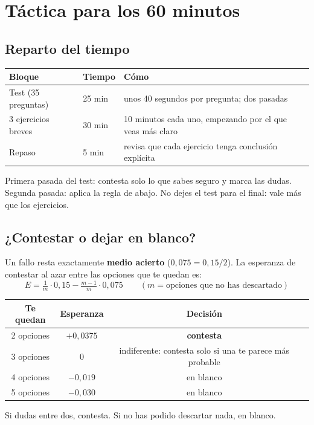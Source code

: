 \documentclass[11pt,a4paper,oneside]{report}
\begin{document}
\tableofcontents
\clearpage

\section{Táctica para los 60 minutos}

\subsection{Reparto del tiempo}
\begin{center}
\begin{tabular}{lll}
\toprule
\textbf{Bloque} & \textbf{Tiempo} & \textbf{Cómo} \\ \midrule
Test (35 preguntas) & 25 min & unos 40 segundos por pregunta; dos pasadas \\
3 ejercicios breves & 30 min & 10 minutos cada uno, empezando por el que veas más claro \\
Repaso & 5 min & revisa que cada ejercicio tenga conclusión explícita \\
\bottomrule
\end{tabular}
\end{center}
Primera pasada del test: contesta solo lo que sabes seguro y marca las dudas. Segunda pasada: aplica la regla
de abajo. No dejes el test para el final: vale más que los ejercicios.

\subsection{¿Contestar o dejar en blanco?}
Un fallo resta exactamente \textbf{medio acierto} ($0{,}075 = 0{,}15/2$). La esperanza de contestar al azar entre
las opciones que te quedan es:
\[
E = \tfrac{1}{m}\cdot 0{,}15 - \tfrac{m-1}{m}\cdot 0{,}075 \qquad (m = \text{opciones que no has descartado})
\]
\begin{center}
\begin{tabular}{cccc}
\toprule
\textbf{Te quedan} & \textbf{Esperanza} & \textbf{Decisión} \\ \midrule
2 opciones & $+0{,}0375$ & \textbf{contesta} \\
3 opciones & $0$ & indiferente: contesta solo si una te parece más probable \\
4 opciones & $-0{,}019$ & en blanco \\
5 opciones & $-0{,}030$ & en blanco \\
\bottomrule
\end{tabular}
\end{center}
\begin{aviso}
Si dudas entre dos, contesta. Si no has podido descartar nada, en blanco.
\end{aviso}
\end{document}
